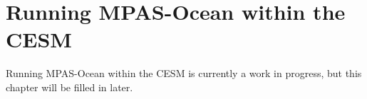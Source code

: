\chapter{Running MPAS-Ocean within the CESM}
\label{chap:cesm_ocean_coupling}

Running MPAS-Ocean within the CESM is currently a work in progress, but this
chapter will be filled in later.
